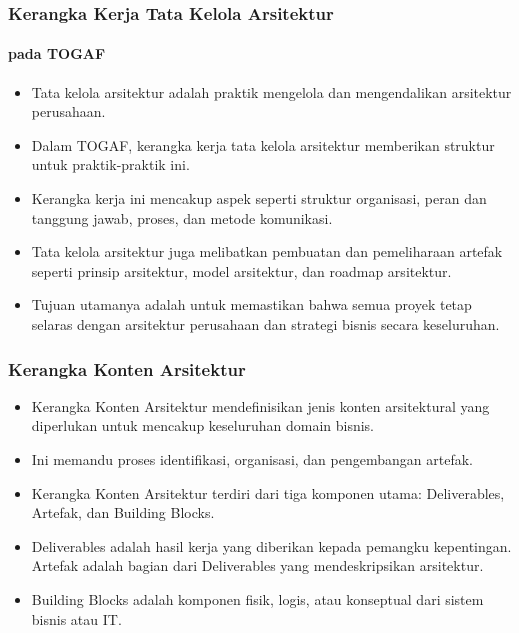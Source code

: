 \documentclass[aspectratio=169, table]{beamer}
\begin{document}
	\begin{frame}
		\frametitle{Kerangka Kerja Tata Kelola Arsitektur }
		\framesubtitle{pada TOGAF}
        \vspace{20pt}
		\begin{itemize}
			\item Tata kelola arsitektur adalah praktik mengelola dan mengendalikan arsitektur perusahaan.
			\item Dalam TOGAF, kerangka kerja tata kelola arsitektur memberikan struktur untuk praktik-praktik ini.
			\item Kerangka kerja ini mencakup aspek seperti struktur organisasi, peran dan tanggung jawab, proses, dan metode komunikasi.
			\item Tata kelola arsitektur juga melibatkan pembuatan dan pemeliharaan artefak seperti prinsip arsitektur, model arsitektur, dan roadmap arsitektur.
			\item Tujuan utamanya adalah untuk memastikan bahwa semua proyek tetap selaras dengan arsitektur perusahaan dan strategi bisnis secara keseluruhan.
		\end{itemize}
	\end{frame}

	\begin{frame}
		\frametitle{Kerangka Konten Arsitektur}
		\begin{itemize}
			\item Kerangka Konten Arsitektur mendefinisikan jenis konten arsitektural yang diperlukan untuk mencakup keseluruhan domain bisnis.
			\item Ini memandu proses identifikasi, organisasi, dan pengembangan artefak.
			\item Kerangka Konten Arsitektur terdiri dari tiga komponen utama: Deliverables, Artefak, dan Building Blocks.
			\item Deliverables adalah hasil kerja yang diberikan kepada pemangku kepentingan. Artefak adalah bagian dari Deliverables yang mendeskripsikan arsitektur.
			\item Building Blocks adalah komponen fisik, logis, atau konseptual dari sistem bisnis atau IT.
		\end{itemize}
	\end{frame}
\end{document}
